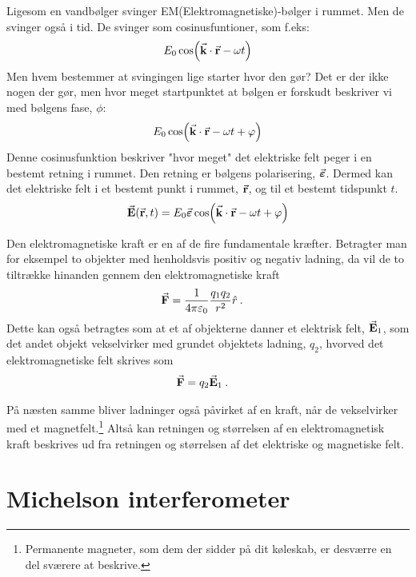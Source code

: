 \documentclass[crop=false, class=memoir]{standalone}
\begin{document}
Ligesom en vandbølger svinger EM(Elektromagnetiske)-bølger i rummet. Men de svinger også i tid. De svinger som cosinusfuntioner, som f.eks:
\begin{align*}
    E_0\cos(\va{k}\cdot\va{r}-\omega t)
\end{align*}
Men hvem bestemmer at svingingen lige starter hvor den gør? Det er der ikke nogen der gør, men hvor meget startpunktet at bølgen er forskudt beskriver vi med bølgens fase, $\phi$:
\begin{align}
    E_0\cos(\va{k}\cdot\va{r}-\omega t + \varphi)
\end{align}
Denne cosinusfunktion beskriver "hvor meget" det elektriske felt peger i en bestemt retning i rummet. Den retning er bølgens polarisering, $\va*{\varepsilon}$. Dermed kan det elektriske felt i et bestemt punkt i rummet, $\va{r}$, og til et bestemt tidspunkt $t$.
\begin{align*}
    \va{E}(\va{r}, t) = E_0 \va*{\varepsilon} \cos(\va{k}\cdot\va{r} - \omega t + \varphi)
\end{align*}


\begin{info}[frametitle={Kort om elektromagnetiske felter}]
    Den elektromagnetiske kraft er en af de fire fundamentale kræfter. Betragter man for eksempel to objekter med henholdsvis positiv og negativ ladning, da vil de to tiltrække hinanden gennem den elektromagnetiske kraft
    \begin{align*}
        \va{F} &= \frac{1}{4\pi\varepsilon_0} \frac{q_1 q_2}{r^2} \hat{r} \: .
    \end{align*}
    Dette kan også betragtes som at et af objekterne danner et elektrisk felt, $\va{E}_1$, som det andet objekt vekselvirker med grundet objektets ladning, $q_2$, hvorved det elektromagnetiske felt skrives som
    \begin{align*}
        \va{F} &= q_2 \va{E}_1 \: .
    \end{align*}
    
    På næsten samme bliver ladninger også  påvirket af en kraft, når de vekselvirker med et magnetfelt.\footnote{Permanente magneter, som dem der sidder på dit køleskab, er desværre en del sværere at beskrive.} Altså kan retningen og størrelsen af en elektromagnetisk kraft beskrives ud fra retningen og størrelsen af det elektriske og magnetiske felt.
\end{info}




\section{Michelson interferometer}
\end{document}
